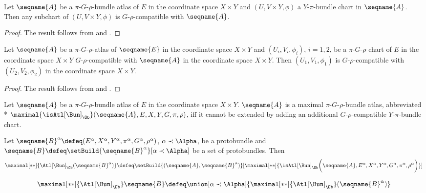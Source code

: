 \documentclass{article}
\begin{document}
\begin{lemma}
\label{lem:BunCompat}
Let $\seqname{A}$ be a $\pi$-$G$-$\rho$-bundle atlas of $E$ in the
coordinate space $X \times Y$ and
$(U, V \times Y, \phi)$ a $Y$-$\pi$-bundle chart in
$\seqname{A}$. Then any subchart of $(U, V \times Y, \phi)$ is
$G$-$\rho$-compatible with $\seqname{A}$.

\begin{proof}
The result follows from  and
.
\end{proof}
\end{lemma}

\begin{lemma}
\label{lem:piGrho-atl:extensions}
Let $\seqname{A}$ be a $\pi$-$G$-$\rho$-atlas of $\seqname{E}$ in the
coordinate space $X \times Y$ and $(U_i,V_i,\phi_i)$, $i=1,2$, be a
$\pi$-$G$-$\rho$ chart of $E$ in the coordinate space $X \times Y$
$G$-$\rho$-compatible with $\seqname{A}$ in the coordinate space $X
\times Y$.  Then $(U_1,V_1,\phi_1)$ is $G$-$\rho$-compatible with
$(U_2,V_2,\phi_2)$ in the coordinate space $X \times Y$.

\begin{proof}
The result follows from  and
.
\end{proof}
\end{lemma}

\begin{definition}
\label{def:Bun-ATLmax}
Let $\seqname{A}$ be a $\pi$-$G$-$\rho$-bundle atlas of $E$ in the
coordinate space $X \times Y$. $\seqname{A}$ is a maximal
$\pi$-$G$-$\rho$-bundle atlas, abbreviated \\*
$
  \maximal{\isAtl[\Bun]_\Ob}
    (
      \seqname{A},
      E,
      X,
      Y,
      G,
      \pi,
      \rho
    )
$,
iff it cannot be extended by adding an additional $G$-$\rho$-compatible
$Y$-$\pi$-bundle chart.

Let
$
  \seqname{B}^\alpha \defeq
  (E^\alpha, X^\alpha, Y^\alpha, \pi^\alpha, G^\alpha, \rho^\alpha)
$,
$\alpha \prec \Alpha$, be a protobundle and
$\seqname{B} \defeq \setBuild{{\seqname{B}^\alpha}}[\alpha \prec \Alpha]$
be a set of protobundles.
Then
\begin{multline}
\maximal[**]{\Atl[\Bun]_\Ob(\seqname{B}^\alpha)} \defeq
  \setBuild
  {{
    (
      \seqname{A},
      \seqname{B}^\alpha
    )
  }}%
  [
    {{
      \maximal[**]
        {
          \isAtl[\Bun]_\Ob
            \biggl (
              \seqname{A},
              E^\alpha,
              X^\alpha,
              Y^\alpha,
              G^\alpha,
              \pi^\alpha,
              \rho^\alpha
            \biggr )
        }
    }}
  ]
\end{multline}

\begin{equation}
\maximal[**]{\Atl[\Bun]_\Ob} \seqname{B} \defeq
  \union
    [\alpha \prec \Alpha]
    {\maximal[**]{\Atl[\Bun]_\Ob}(\seqname{B}^\alpha)}
\end{equation}
\end{definition}
\end{document}
